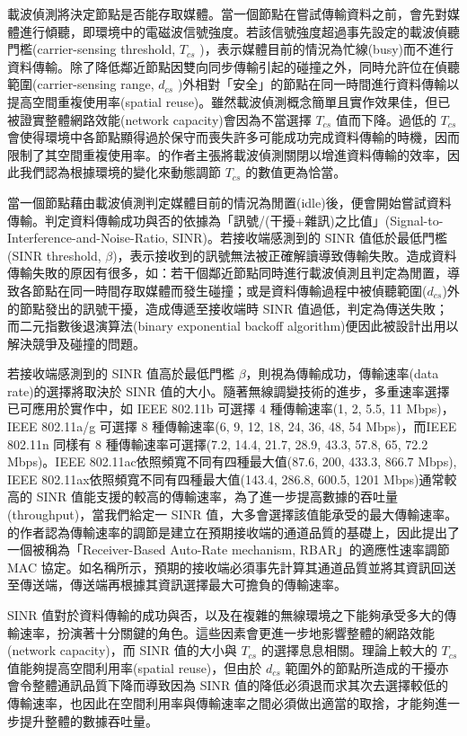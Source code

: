 \documentclass[12pt,a4paper]{article}
\begin{document}
\begin{description}
載波偵測將決定節點是否能存取媒體。當一個節點在嘗試傳輸資料之前，會先對媒體進行傾聽，即環境中的電磁波信號強度。若該信號強度超過事先設定的載波偵聽門檻(carrier-sensing threshold, $T_{cs}$ )，表示媒體目前的情況為忙線(busy)而不進行資料傳輸。除了降低鄰近節點因雙向同步傳輸引起的碰撞之外，同時允許位在偵聽範圍(carrier-sensing range, $d_{cs}$ )外相對「安全」的節點在同一時間進行資料傳輸以提高空間重複使用率(spatial reuse)。雖然載波偵測概念簡單且實作效果佳，但已被\cite{sigcomm05_rwpcs}證實整體網路效能(network capacity)會因為不當選擇 $T_{cs}$ 值而下降。過低的 $T_{cs}$ 會使得環境中各節點顯得過於保守而喪失許多可能成功完成資料傳輸的時機，因而限制了其空間重複使用率。\cite{sigcomm05_rwpcs}的作者主張將載波偵測關閉以增進資料傳輸的效率，因此我們認為根據環境的變化來動態調節 $T_{cs}$ 的數值更為恰當。

當一個節點藉由載波偵測判定媒體目前的情況為閒置(idle)後，便會開始嘗試資料傳輸。判定資料傳輸成功與否的依據為「訊號/(干擾+雜訊)之比值」(Signal-to-Interference-and-Noise-Ratio, SINR)。若接收端感測到的 SINR 值低於最低門檻(SINR threshold, $\beta$)，表示接收到的訊號無法被正確解讀導致傳輸失敗。造成資料傳輸失敗的原因有很多，如：若干個鄰近節點同時進行載波偵測且判定為閒置，導致各節點在同一時間存取媒體而發生碰撞；或是資料傳輸過程中被偵聽範圍($d_{cs}$)外的節點發出的訊號干擾，造成傳遞至接收端時 SINR 值過低，判定為傳送失敗；而二元指數後退演算法(binary exponential backoff algorithm)便因此被設計出用以解決競爭及碰撞的問題。

若接收端感測到的 SINR 值高於最低門檻 $\beta$，則視為傳輸成功，傳輸速率(data rate)的選擇將取決於 SINR 值的大小。隨著無線調變技術的進步，多重速率選擇已可應用於實作中，如 IEEE 802.11b 可選擇 4 種傳輸速率(1, 2, 5.5, 11 Mbps)，IEEE 802.11a/g 可選擇 8 種傳輸速率(6, 9, 12, 18, 24, 36, 48, 54 Mbps)，而IEEE 802.11n 同樣有 8 種傳輸速率可選擇(7.2, 14.4, 21.7, 28.9, 43.3, 57.8, 65, 72.2 Mbps)。IEEE 802.11ac依照頻寬不同有四種最大值(87.6, 200, 433.3, 866.7 Mbps), IEEE 802.11ax依照頻寬不同有四種最大值(143.4, 286.8, 600.5, 1201 Mbps)通常較高的 SINR 值能支援的較高的傳輸速率，為了進一步提高數據的吞吐量(throughput)，當我們給定一 SINR 值，大多會選擇該值能承受的最大傳輸速率。\cite{mobicom01_ramp}的作者認為傳輸速率的調節是建立在預期接收端的通道品質的基礎上，因此提出了一個被稱為「Receiver-Based Auto-Rate mechanism, RBAR」的適應性速率調節 MAC 協定。如名稱所示，預期的接收端必須事先計算其通道品質並將其資訊回送至傳送端，傳送端再根據其資訊選擇最大可擔負的傳輸速率。 

SINR 值對於資料傳輸的成功與否，以及在複雜的無線環境之下能夠承受多大的傳輸速率，扮演著十分關鍵的角色。這些因素會更進一步地影響整體的網路效能(network capacity)，而 SINR 值的大小與 $T_{cs}$ 的選擇息息相關。理論上較大的 $T_{cs}$ 值能夠提高空間利用率(spatial reuse)，但由於 $d_{cs}$ 範圍外的節點所造成的干擾亦會令整體通訊品質下降而導致因為 SINR 值的降低必須退而求其次去選擇較低的傳輸速率，也因此在空間利用率與傳輸速率之間必須做出適當的取捨，才能夠進一步提升整體的數據吞吐量。 


\end{description}
\end{document}
